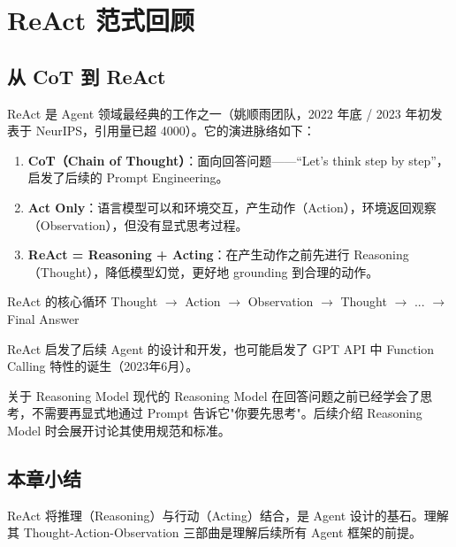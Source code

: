 \section{ReAct 范式回顾}

\subsection{从 CoT 到 ReAct}

ReAct 是 Agent 领域最经典的工作之一（姚顺雨团队，2022 年底 / 2023 年初发表于 NeurIPS，引用量已超 4000）。它的演进脉络如下：

\begin{enumerate}
    \item \textbf{CoT（Chain of Thought）}：面向回答问题——``Let's think step by step''，启发了后续的 Prompt Engineering。
    \item \textbf{Act Only}：语言模型可以和环境交互，产生动作（Action），环境返回观察（Observation），但没有显式思考过程。
    \item \textbf{ReAct = Reasoning + Acting}：在产生动作之前先进行 Reasoning（Thought），降低模型幻觉，更好地 grounding 到合理的动作。
\end{enumerate}

\begin{importantbox}{ReAct 的核心循环}
Thought $\rightarrow$ Action $\rightarrow$ Observation $\rightarrow$ Thought $\rightarrow$ ... $\rightarrow$ Final Answer

ReAct 启发了后续 Agent 的设计和开发，也可能启发了 GPT API 中 Function Calling 特性的诞生（2023年6月）。
\end{importantbox}

\begin{knowledgebox}{关于 Reasoning Model}
现代的 Reasoning Model 在回答问题之前已经学会了思考，不需要再显式地通过 Prompt 告诉它"你要先思考"。后续介绍 Reasoning Model 时会展开讨论其使用规范和标准。
\end{knowledgebox}

\subsection{本章小结}
ReAct 将推理（Reasoning）与行动（Acting）结合，是 Agent 设计的基石。理解其 Thought-Action-Observation 三部曲是理解后续所有 Agent 框架的前提。

